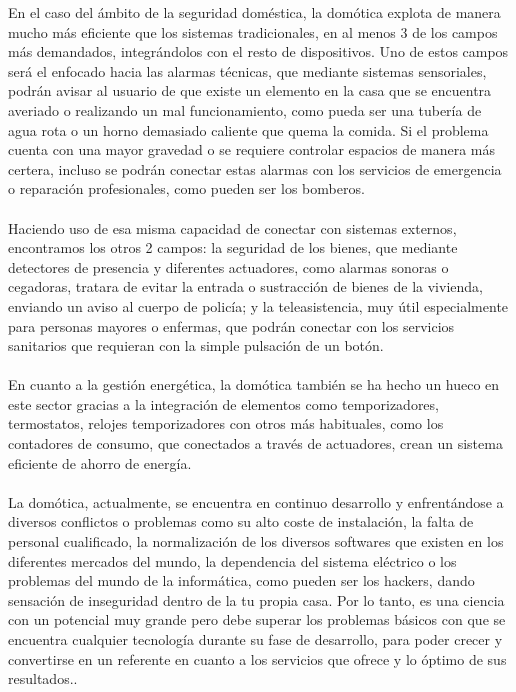 En el caso del ámbito de la seguridad doméstica, la domótica explota de manera mucho más eficiente que los sistemas tradicionales, en al menos 3 de los campos más demandados, integrándolos con el resto de dispositivos. Uno de estos campos será el enfocado hacia las alarmas técnicas, que mediante sistemas sensoriales, podrán avisar al usuario de que existe un elemento en la casa que se encuentra averiado o realizando un mal funcionamiento, como pueda ser una tubería de agua rota o un horno demasiado caliente que quema la comida. Si el problema cuenta con una mayor gravedad o se requiere controlar espacios de manera más certera, incluso se podrán conectar estas alarmas con los servicios de emergencia o reparación profesionales, como pueden ser los bomberos. \\\\
Haciendo uso de esa misma capacidad de conectar con sistemas externos, encontramos los otros 2 campos: la seguridad de los bienes, que mediante detectores de presencia y diferentes actuadores, como alarmas sonoras o cegadoras, tratara de evitar la entrada o sustracción de bienes de la vivienda, enviando un aviso al cuerpo de policía; y la teleasistencia, muy útil especialmente para personas mayores o enfermas, que podrán conectar con los servicios sanitarios que requieran con la simple pulsación de un botón.\\\\
En cuanto a la gestión energética, la domótica también se ha hecho un hueco en este sector gracias a la integración de elementos como temporizadores, termostatos, relojes temporizadores con otros más habituales, como los contadores de consumo, que conectados a través de actuadores, crean un sistema eficiente de ahorro de energía.\\\\
La domótica, actualmente, se encuentra en continuo desarrollo y enfrentándose a diversos conflictos o problemas como su alto coste de instalación, la falta de personal cualificado, la normalización de los diversos softwares que existen en los diferentes mercados del mundo, la dependencia del sistema eléctrico o los problemas del mundo de la informática, como pueden ser los hackers, dando sensación de inseguridad dentro de la tu propia casa. Por lo tanto, es una ciencia con un potencial muy grande pero debe superar los problemas básicos con que se encuentra cualquier tecnología durante su fase de desarrollo, para poder crecer y convertirse en un referente en cuanto a los servicios que ofrece y lo óptimo de sus resultados..\\\\
